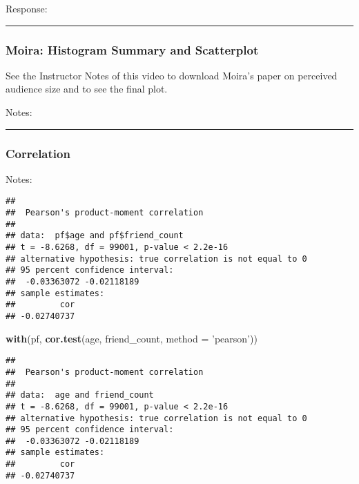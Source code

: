 \documentclass[]{article}
\newenvironment{Shaded}{\begin{snugshade}}{\end{snugshade}}
\newcommand{\KeywordTok}[1]{\textcolor[rgb]{0.13,0.29,0.53}{\textbf{#1}}}
\newcommand{\DataTypeTok}[1]{\textcolor[rgb]{0.13,0.29,0.53}{#1}}
\newcommand{\StringTok}[1]{\textcolor[rgb]{0.31,0.60,0.02}{#1}}
\newcommand{\OperatorTok}[1]{\textcolor[rgb]{0.81,0.36,0.00}{\textbf{#1}}}
\newcommand{\NormalTok}[1]{#1}
\begin{document}
Response:

\begin{center}\rule{0.5\linewidth}{\linethickness}\end{center}

\subsubsection{Moira: Histogram Summary and
Scatterplot}\label{moira-histogram-summary-and-scatterplot}

See the Instructor Notes of this video to download Moira's paper on
perceived audience size and to see the final plot.

Notes:

\begin{center}\rule{0.5\linewidth}{\linethickness}\end{center}

\subsubsection{Correlation}\label{correlation}

Notes:

\begin{Shaded}
\end{Shaded}

\begin{verbatim}
## 
##  Pearson's product-moment correlation
## 
## data:  pf$age and pf$friend_count
## t = -8.6268, df = 99001, p-value < 2.2e-16
## alternative hypothesis: true correlation is not equal to 0
## 95 percent confidence interval:
##  -0.03363072 -0.02118189
## sample estimates:
##         cor 
## -0.02740737
\end{verbatim}

\begin{Shaded}
\begin{Highlighting}[]
\KeywordTok{with}\NormalTok{(pf, }\KeywordTok{cor.test}\NormalTok{(age, friend_count, }\DataTypeTok{method =} \StringTok{'pearson'}\NormalTok{))}
\end{Highlighting}
\end{Shaded}

\begin{verbatim}
## 
##  Pearson's product-moment correlation
## 
## data:  age and friend_count
## t = -8.6268, df = 99001, p-value < 2.2e-16
## alternative hypothesis: true correlation is not equal to 0
## 95 percent confidence interval:
##  -0.03363072 -0.02118189
## sample estimates:
##         cor 
## -0.02740737
\end{verbatim}
\end{document}
